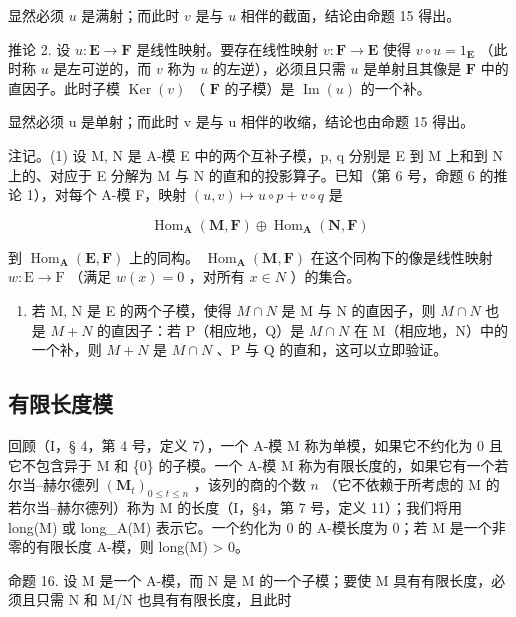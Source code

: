 显然必须 \(u\) 是满射；而此时 \(v\) 是与 \(u\) 相伴的截面，结论由命题 15 得出。

推论 2. 设 \(u: \mathbf{E} \to \mathbf{F}\) 是线性映射。要存在线性映射 \(v: \mathbf{F} \to \mathbf{E}\) 使得 \(v \circ u = 1_{\mathbf{E}}\) （此时称 \(u\) 是左可逆的，而 \(v\) 称为 \(u\) 的左逆），必须且只需 \(u\) 是单射且其像是 \(\mathbf{F}\) 中的直因子。此时子模 \(\operatorname{Ker}(v)\) （ \(\mathbf{F}\) 的子模）是 \(\operatorname{Im}(u)\) 的一个补。

显然必须 u 是单射；而此时 v 是与 u 相伴的收缩，结论也由命题 15 得出。

注记。(1) 设 M, N 是 A-模 E 中的两个互补子模，p, q 分别是 E 到 M 上和到 N 上的、对应于 E 分解为 M 与 N 的直和的投影算子。已知（第 6 号，命题 6 的推论 1），对每个 A-模 F，映射 \((u, v) \mapsto u \circ p + v \circ q\) 是

\[
\operatorname{Hom} _ {\mathbf {A}} (\mathbf {M}, \mathbf {F}) \oplus \operatorname{Hom} _ {\mathbf {A}} (\mathbf {N}, \mathbf {F})
\]

到 \(\operatorname{Hom}_{\mathbf{A}}(\mathbf{E},\mathbf{F})\) 上的同构。 \(\operatorname{Hom}_{\mathbf{A}}(\mathbf{M},\mathbf{F})\) 在这个同构下的像是线性映射 \(w:\mathrm{E}\to \mathrm{F}\) （满足 \(w(x) = 0\) ，对所有 \(x\in N\) ）的集合。

\begin{enumerate}
\def\labelenumi{(\arabic{enumi})}
\setcounter{enumi}{1}
\tightlist
\item
  若 M, N 是 E 的两个子模，使得 \(M \cap N\) 是 M 与 N 的直因子，则 \(M \cap N\) 也是 \(M + N\) 的直因子：若 P（相应地，Q）是 \(M \cap N\) 在 M（相应地，N）中的一个补，则 \(M + N\) 是 \(M \cap N\) 、P 与 Q 的直和，这可以立即验证。
\end{enumerate}

\subsection{有限长度模}

回顾（I，§ 4，第 4 号，定义 7），一个 A-模 M 称为单模，如果它不约化为 0 且它不包含异于 M 和 \{0\} 的子模。一个 A-模 M 称为有限长度的，如果它有一个若尔当–赫尔德列 \((\mathbf{M}_t)_{0 \leqslant t \leqslant n}\) ，该列的商的个数 \(n\) （它不依赖于所考虑的 M 的若尔当–赫尔德列）称为 M 的长度（I，§4，第 7 号，定义 11）；我们将用 long(M) 或 long\_A(M) 表示它。一个约化为 0 的 A-模长度为 0；若 M 是一个非零的有限长度 A-模，则 long(M) \textgreater{} 0。

命题 16. 设 M 是一个 A-模，而 N 是 M 的一个子模；要使 M 具有有限长度，必须且只需 N 和 M/N 也具有有限长度，且此时

